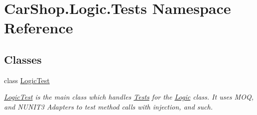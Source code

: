 \hypertarget{namespace_car_shop_1_1_logic_1_1_tests}{}\section{Car\+Shop.\+Logic.\+Tests Namespace Reference}
\label{namespace_car_shop_1_1_logic_1_1_tests}
\subsection*{Classes}
\begin{DoxyCompactItemize}
\item 
class \mbox{\hyperlink{class_car_shop_1_1_logic_1_1_tests_1_1_logic_test}{Logic\+Test}}
\begin{DoxyCompactList}\small\item\em \mbox{\hyperlink{class_car_shop_1_1_logic_1_1_tests_1_1_logic_test}{Logic\+Test}} is the main class which handles \mbox{\hyperlink{namespace_car_shop_1_1_logic_1_1_tests}{Tests}} for the \mbox{\hyperlink{class_car_shop_1_1_logic_1_1_logic}{Logic}} class. It uses M\+OQ, and N\+U\+N\+I\+T3 Adapters to test method calls with injection, and such. \end{DoxyCompactList}\end{DoxyCompactItemize}
